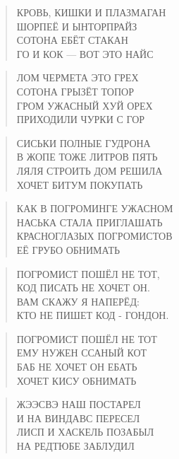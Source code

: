 \poemtitle{***}
\begin{verse}
КРОВЬ, КИШКИ И ПЛАЗМАГАН\\
ШОРПЕЁ И ЫНТОРПРАЙЗ\\
СОТОНА ЕБЁТ СТАКАН\\
ГО И КОК — ВОТ ЭТО НАЙС
\end{verse}

\poemtitle{***}
\begin{verse}
ЛОМ ЧЕРМЕТА ЭТО ГРЕХ\\
СОТОНА ГРЫЗЁТ ТОПОР\\
ГРОМ УЖАСНЫЙ ХУЙ ОРЕХ\\
ПРИХОДИЛИ ЧУРКИ С ГОР
\end{verse}

\poemtitle{***}
\begin{verse}
СИСЬКИ ПОЛНЫЕ ГУДРОНА\\
В ЖОПЕ ТОЖЕ ЛИТРОВ ПЯТЬ\\
ЛЯЛЯ СТРОИТЬ ДОМ РЕШИЛА\\
ХОЧЕТ БИТУМ ПОКУПАТЬ
\end{verse}

\poemtitle{***}
\begin{verse}
КАК В ПОГРОМИНГЕ УЖАСНОМ\\
НАСЬКА СТАЛА ПРИГЛАШАТЬ\\
КРАСНОГЛАЗЫХ ПОГРОМИСТОВ\\
ЕЁ ГРУБО ОБНИМАТЬ
\end{verse}

\poemtitle{***}
\begin{verse}
ПОГРОМИСТ ПОШЁЛ НЕ ТОТ,\\
КОД ПИСАТЬ НЕ ХОЧЕТ ОН.\\
ВАМ СКАЖУ Я НАПЕРЁД:\\
КТО НЕ ПИШЕТ КОД - ГОНДОН.
\end{verse}

\poemtitle{***}
\begin{verse}
ПОГРОМИСТ ПОШЁЛ НЕ ТОТ\\
ЕМУ НУЖЕН ССАНЫЙ КОТ\\
БАБ НЕ ХОЧЕТ ОН ЕБАТЬ\\
ХОЧЕТ КИСУ ОБНИМАТЬ
\end{verse}

\poemtitle{***}
\begin{verse}
ЖЭЭСВЭ НАШ ПОСТАРЕЛ\\
И НА ВИНДАВС ПЕРЕСЕЛ\\
ЛИСП И ХАСКЕЛЬ ПОЗАБЫЛ\\
НА РЕДТЮБЕ ЗАБЛУДИЛ
\end{verse}

